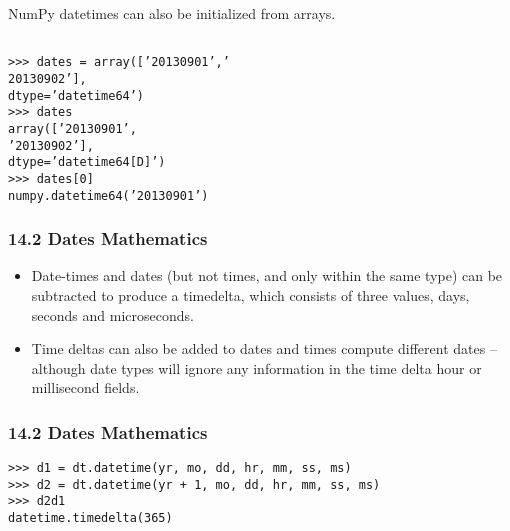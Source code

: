 \documentclass[KSmainSlides.tex]{subfiles}
\begin{document}
\begin{frame}[fragile]
NumPy datetimes can also be initialized from arrays.
	\begin{framed}
		\begin{verbatim}

>>> dates = array([’20130901’,’
20130902’],
dtype=’datetime64’)
>>> dates
array([’20130901’,
’20130902’],
dtype=’datetime64[D]’)
>>> dates[0]
numpy.datetime64(’20130901’)
\end{verbatim}
\end{framed}

\end{frame}
\begin{frame}[fragile]
\frametitle{14.2 Dates Mathematics}
\begin{itemize}
\item Date-times and dates (but not times, and only within the same type) can be subtracted to produce a
timedelta, which consists of three values, days, seconds and microseconds.
\item  Time deltas can also be added
to dates and times compute different dates – although date types will ignore any information in the time
delta hour or millisecond fields.
\end{itemize}

\end{frame}
\begin{frame}[fragile]
\frametitle{14.2 Dates Mathematics}
	\begin{framed}
		\begin{verbatim}
>>> d1 = dt.datetime(yr, mo, dd, hr, mm, ss, ms)
>>> d2 = dt.datetime(yr + 1, mo, dd, hr, mm, ss, ms)
>>> d2d1
datetime.timedelta(365)

\end{verbatim}
\end{framed}

\end{frame}
\end{document}
